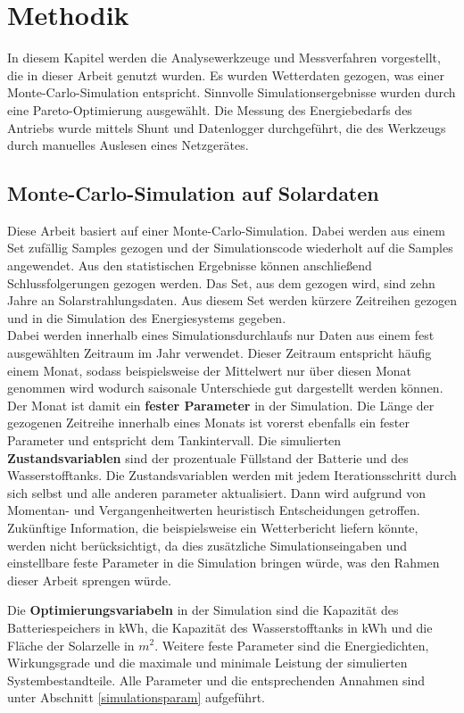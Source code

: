 \clearpage
\section{Methodik}
In diesem Kapitel werden die Analysewerkzeuge und Messverfahren vorgestellt, die in dieser Arbeit genutzt wurden. Es wurden Wetterdaten gezogen, was einer Monte-Carlo-Simulation entspricht. Sinnvolle Simulationsergebnisse wurden durch eine Pareto-Optimierung ausgewählt. Die Messung des Energiebedarfs des Antriebs wurde mittels Shunt und Datenlogger durchgeführt, die des Werkzeugs durch manuelles Auslesen eines Netzgerätes.
\subsection{Monte-Carlo-Simulation auf Solardaten}
Diese Arbeit basiert auf einer Monte-Carlo-Simulation. Dabei werden aus einem Set zufällig Samples gezogen und der Simulationscode wiederholt auf die Samples angewendet. Aus den statistischen Ergebnisse können anschließend Schlussfolgerungen gezogen werden. Das Set, aus dem gezogen wird, sind zehn Jahre an Solarstrahlungsdaten. Aus diesem Set werden kürzere Zeitreihen gezogen und in die Simulation des Energiesystems gegeben. \\
Dabei werden innerhalb eines Simulationsdurchlaufs nur Daten aus einem fest ausgewählten Zeitraum im Jahr verwendet. Dieser Zeitraum entspricht häufig einem Monat, sodass beispielsweise der Mittelwert nur über diesen Monat genommen wird wodurch saisonale Unterschiede gut dargestellt werden können. Der Monat ist damit ein \textbf{fester Parameter} in der Simulation. Die Länge der gezogenen Zeitreihe innerhalb eines Monats ist vorerst ebenfalls ein fester Parameter und entspricht dem Tankintervall. Die simulierten \textbf{Zustandsvariablen} sind der prozentuale Füllstand der Batterie und des Wasserstofftanks. Die Zustandsvariablen werden mit jedem Iterationsschritt durch sich selbst und alle anderen parameter aktualisiert. Dann wird aufgrund von Momentan- und Vergangenheitwerten heuristisch Entscheidungen getroffen. Zukünftige Information, die beispielsweise ein Wetterbericht liefern könnte, werden nicht berücksichtigt, da dies zusätzliche Simulationseingaben und einstellbare feste Parameter in die Simulation bringen würde, was den Rahmen dieser Arbeit sprengen würde.

Die \textbf{Optimierungsvariabeln} in der Simulation sind die Kapazität des Batteriespeichers in kWh, die Kapazität des Wasserstofftanks in kWh und die Fläche der Solarzelle in $m^{2}$. Weitere feste Parameter sind die Energiedichten, Wirkungsgrade und die maximale und minimale Leistung der simulierten Systembestandteile. Alle Parameter und die entsprechenden Annahmen sind unter Abschnitt \ref{simulationsparam} aufgeführt.
